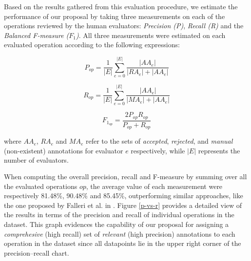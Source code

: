 Based on the results gathered from this evaluation procedure, we estimate the performance of our proposal by taking three measurements on each of the operations reviewed by the human evaluators: \textit{Precision (P)}, \textit{Recall (R)} and the \textit{Balanced F-measure ($F_1$)}. All three measurements were estimated on each evaluated operation according to the following expressions:

\begin{equation}
P_{op}=\frac{1}{\left|E\right|}\sum_{e=0}^{\left|E\right|}{\displaystyle {\textstyle {\displaystyle \frac{\left|AA_{e}\right|}{\left|RA_{e}\right|+\left|AA_{e}\right|}}}}\label{eq:3}
\end{equation}

\begin{equation}
R_{op}=\frac{1}{\left|E\right|}\sum_{e=0}^{\left|E\right|}{\displaystyle {\textstyle {\displaystyle \frac{\left|AA_{e}\right|}{\left|MA_{e}\right|+\left|AA_{e}\right|}}}}\label{eq:4}
\end{equation}

\begin{equation}
F_{1_{op}}={\displaystyle {\textstyle {\displaystyle \frac{2P_{op}R_{op}}{P_{op}+R_{op}}}}}\label{eq:5}
\end{equation}

where $AA_{e}$, $RA_{e}$ and $MA_{e}$ refer to the sets of \textit{accepted}, \textit{rejected}, and \textit{manual} (non-existent) annotations for evaluator $e$ respectively, while $\left|E\right|$ represents the number of evaluators.

When computing the overall precision, recall and F-measure by summing over all the evaluated operations $op$, the average value of each measurement were respectively 81.48\%, 90.48\% and 85.45\%, outperforming similar approaches, like the one proposed by Falleri et al. in \cite{Falleri:2010}. Figure \ref{p-vs-r} provides a detailed view of the results in terms of the precision and recall of individual operations in the dataset. This graph evidences the capability of our proposal for assigning a \textit{comprehesive} (high recall) set of \textit{relevant} (high precision) annotations to each operation in the dataset since all datapoints lie in the upper right corner of the precision--recall chart.

